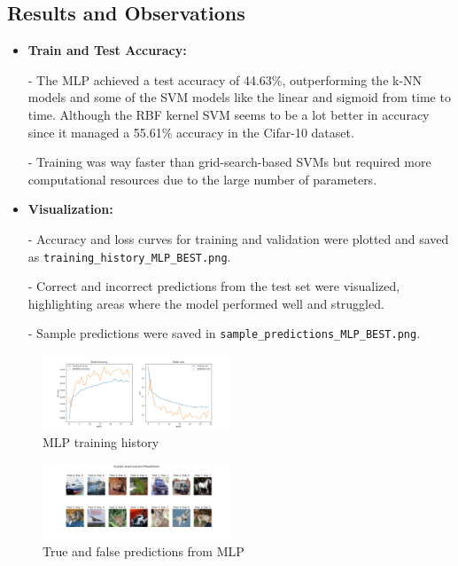 \documentclass[lettersize,journal]{IEEEtran}
\begin{document}
\subsection{\textbf{Results and Observations}}
\begin{itemize}
    \item \textbf{Train and Test Accuracy:} 
    
    - The MLP achieved a test accuracy of 44.63\%, outperforming the k-NN models and some of the SVM models like the linear and sigmoid from time to time. Although the RBF kernel SVM seems to be a lot better in accuracy since it managed a 55.61\% accuracy in the Cifar-10 dataset.
    
    - Training was way faster than grid-search-based SVMs but required more computational resources due to the large number of parameters.
    \item \textbf{Visualization:} 
    
    - Accuracy and loss curves for training and validation were plotted and saved as \texttt{training\_history\_MLP\_BEST.png}.
    
    - Correct and incorrect predictions from the test set were visualized, highlighting areas where the model performed well and struggled.
    
    - Sample predictions were saved in \texttt{sample\_predictions\_MLP\_BEST.png}.
\end{itemize}

\begin{figure}
    \centering
    \includegraphics[width=0.5\textwidth]{training_history_MLP_BEST.png}
    \caption{MLP training history}
    \label{fig:MLP history}
\end{figure}

\begin{figure}[H]
    \centering
    \includegraphics[width=0.5\textwidth]{sample_predictions_MLP_BEST.png}
    \caption{True and false predictions from MLP}
    \label{fig:True-False-Pred}
\end{figure}
\end{document}
